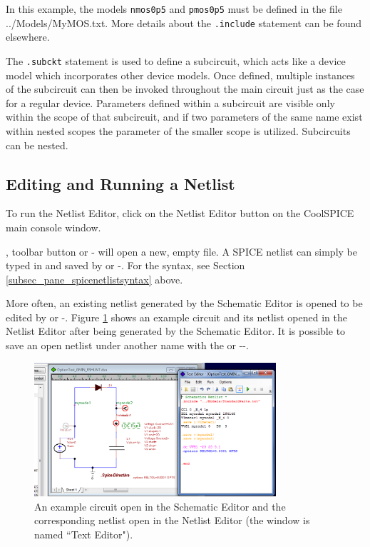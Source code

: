 In this example, the models \texttt{nmos0p5} and \texttt{pmos0p5} must be defined in the file \textsf{../Models/MyMOS.txt}. More details about the \texttt{.include} statement can be found elsewhere.  

The \texttt{.subckt} statement is used to define a subcircuit,  which acts like a device model which incorporates other device models. Once defined, multiple instances of the subcircuit can then be invoked  throughout the main circuit just as the case for a regular device. Parameters defined within a subcircuit are visible only within the scope of that subcircuit, and if two parameters of the same name exist within nested scopes the parameter of the smaller scope is utilized. Subcircuits can be nested.


\subsection{Editing and Running a Netlist}
\label{subsec_pane_editingrunningnetlist}

To run the Netlist Editor, click on the \textsf{Netlist Editor} button on the CoolSPICE main console window.

,  toolbar button or - will open a new, empty file. A SPICE netlist can simply be typed in and saved by  or -.  For the syntax, see Section \ref{subsec_pane_spicenetlistsyntax} above.  

More often, an existing netlist generated by the Schematic Editor is opened to be edited by  or -.  Figure \ref{fig_netlisteditor_netlistexample1} shows an example circuit and its netlist opened in the Netlist Editor after being generated by the Schematic Editor.  It is possible to save an open netlist under another name with the  or --.

\begin{figure}[bh]
  \centering
    \includegraphics[width=0.8\textwidth]{./figures/plotter_netlist_editor_figures/NetlistEditor_ExampleNetlist1.png}
    \caption{An example circuit open in the Schematic Editor and the corresponding netlist open in the Netlist Editor (the window is named ``Text Editor").}
  \label{fig_netlisteditor_netlistexample1}
\end{figure} 

